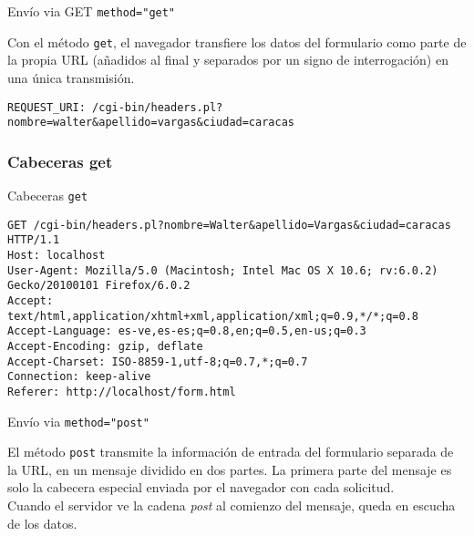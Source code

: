 \documentclass{beamer}
\begin{document}
\begin{frame}[fragile]{Envío via GET \texttt{method="get"}} %
    \begin{center}
        Con el método \texttt{get}, el navegador transfiere los datos del
        formulario como parte de la propia URL (añadidos al final y separados
        por un signo de interrogación) en una única transmisión. 

        \begin{verbatim}
REQUEST_URI: /cgi-bin/headers.pl?nombre=walter&apellido=vargas&ciudad=caracas
        \end{verbatim}
    \end{center}
\end{frame}

\subsubsection{Cabeceras get} 

\begin{frame}[fragile]{Cabeceras \texttt{get}} %
    \begin{center}
    \footnotesize{ 
        \begin{verbatim}
GET /cgi-bin/headers.pl?nombre=Walter&apellido=Vargas&ciudad=caracas HTTP/1.1
Host: localhost
User-Agent: Mozilla/5.0 (Macintosh; Intel Mac OS X 10.6; rv:6.0.2) Gecko/20100101 Firefox/6.0.2
Accept: text/html,application/xhtml+xml,application/xml;q=0.9,*/*;q=0.8
Accept-Language: es-ve,es-es;q=0.8,en;q=0.5,en-us;q=0.3
Accept-Encoding: gzip, deflate
Accept-Charset: ISO-8859-1,utf-8;q=0.7,*;q=0.7
Connection: keep-alive
Referer: http://localhost/form.html
        \end{verbatim}
        }
    \end{center}

\end{frame}

\begin{frame}{Envío via \texttt{method="post"}} %
    \begin{center}
        El método \texttt{post} transmite la información de entrada del
        formulario separada de la URL, en un mensaje dividido en dos partes. La
        primera parte del mensaje es solo la cabecera especial enviada por el
        navegador con cada solicitud. \\[0.4cm]
        \pause
        Cuando el servidor ve la cadena \textit{post} al comienzo del mensaje,
        queda en escucha de los datos. 
    \end{center}
\end{frame}
\end{document}
